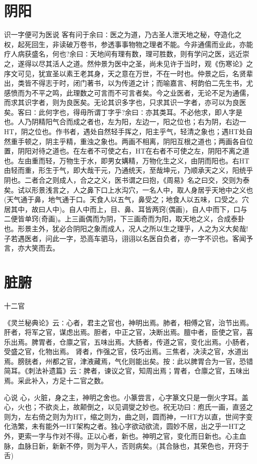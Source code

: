 \documentclass[a4paper,12pt,UTF8,twoside]{ctexbook}
\begin{document}
	\chapter{阴阳}
    识一字便可为医说	
	客有问于余曰∶医之为道，乃古圣人泄天地之秘，夺造化之权，起死回生，非读破万卷书，参透事事物物之理者不能。今非通儒而业此，亦能疗人病获盛名，何也?余曰∶天地间有理有数，理可胜数，则有学问之医，远近崇之，遂得以尽其活人之道。然仲景为医中之圣，尚未见许于当时，观《伤寒论》之序文可见，犹宣圣以素王老其身，天之意在万世，不在一时也。仲景之后，名贤辈出，类皆不得志于时，闭门著书，以为传道之计；而喻嘉言、柯韵伯二先生书，尤感愤而为不平之鸣，此理数之可言而不可言者矣。今之业医者，无论不足为通儒，而求其识字者，则为良医矣。无论其识多字也，只求其识一字者，亦可以为良医矣。客曰∶此何字也，得毋所谓丁字乎?余曰∶亦其类耳。不必他求，即人字是也。人乃阴精阳气合而成之者也，左为阳，左边一，阳之位也；右为阴，右边一HT，阴之位也。作书者，遇处自然轻手挥之，阳主乎气，轻清之象也；遇HT处自然重手顿之，阴主乎精，重浊之象也。两画不相离，阴阳互根之道也；两画各自位置，阴阳对待之道也。在左者不可使之右，HT在右者不可使之左，阴阳不离之道也。左由重而轻，万物生于水，即男女媾精，万物化生之义，由阴而阳也。右HT由轻而重，形生于气，即大哉干元，乃通统天，至哉坤元，乃顺承天之义，阳统乎阴也。二者合之则成人，合之之义，医书谓之曰抱，《周易》名之曰交，交则为泰矣。试以形景浅言之，人之鼻下口上水沟穴，一名人中，取人身居乎天地中之义也(天气通于鼻，地气通于口。天食人以五气，鼻受之；地食人以五味，口受之。穴居其中，故曰人中)。自人中而上，目、鼻、耳皆两窍(偶画)，自人中而下，口与二便皆单窍(奇画)。上三画偶而为阴，下三画奇而为阳，取天地之义，合成泰卦也。形景主外，犹必合阴阳之象而成人，况人之所以生之理乎，人之为义大矣哉!子若遇医者，问此一字，恐高车驷马，诩诩以名医自负者，亦一字不识也。客闻予言，亦大笑而去。

	\chapter{脏腑}
	十二官
  
	《灵兰秘典论》云∶心者，君主之官也，神明出焉。肺者，相傅之官，治节出焉。肝者，将军之官，谋虑出焉。胆者，中正之官，决断出焉。膻中者，臣使之官，喜乐出焉。脾胃者，仓廪之官，五味出焉。大肠者，传道之官，变化出焉。小肠者，受盛之官，化物出焉。
	肾者，作强之官，伎巧出焉。三焦者，决渎之官，水道出焉。膀胱者，州都之官，津液藏焉，气化则能出矣。按∶此以脾胃合为一官，恐错简耳。《刺法补遗篇》云∶脾者，谏议之官，知周出焉；胃者，仓廪之官，五味出焉。采此补入，方足十二官之数。
		
	心说
	心，火脏，身之主，神明之舍也。小篆尝言，心字篆文只是一倒火字耳。盖心，火也；不欲炎上，故颠倒之，以见调燮之妙也。祝无功曰∶庖氏一画，直竖之则为，左右倚之则为为HT，缩之则为，曲之则，圆而神，一HT方以直，世间字变化浩繁，未有能外一HT架构之者。独心字欲动欲流，圆妙不居，出之乎一HT之外，更索一字与作对不得。正以心者，新也。神明之官，变化而日新也。心主血脉，血脉日新，新新不停，则为平人，否则病矣。(其合脉也，其荣色也，开窍于舌)
	
\end{document}
